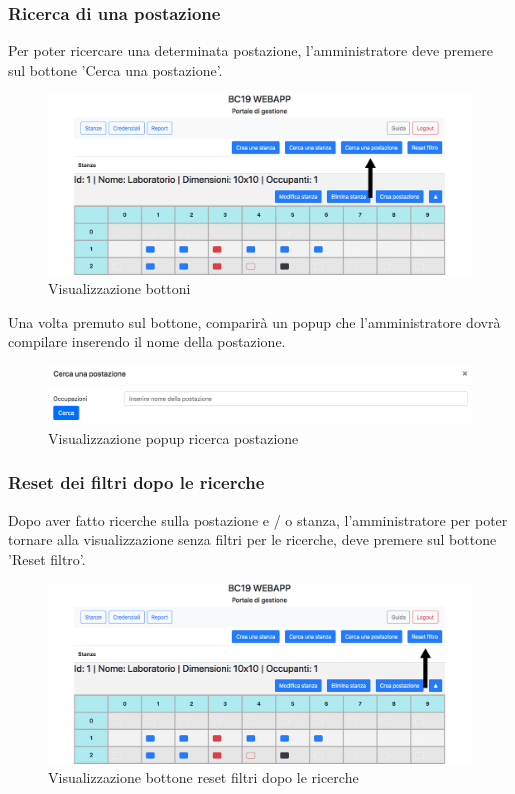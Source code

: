 \subsubsection{Ricerca di una postazione}
Per poter ricercare una determinata postazione, l'amministratore deve premere sul bottone 'Cerca una postazione'.
\begin{figure}[H]
	\centering
	\includegraphics[width=15cm]{res/images/bottoneSearchWorkstation.png}
	\caption{Visualizzazione bottoni}
\end{figure}
Una volta premuto sul bottone, comparirà un popup che l'amministratore dovrà compilare inserendo il nome della postazione.
\begin{figure}[H]
	\centering
	\includegraphics[width=15cm]{res/images/searchWorkstation.png}
	\caption{Visualizzazione popup ricerca postazione}
\end{figure}

\subsubsection{Reset dei filtri dopo le ricerche}
Dopo aver fatto ricerche sulla postazione e / o stanza, l'amministratore per poter tornare alla visualizzazione senza filtri per le ricerche, deve premere sul bottone 'Reset filtro'.
\begin{figure}[H]
	\centering
	\includegraphics[width=15cm]{res/images/resetFiltri.png}
	\caption{Visualizzazione bottone reset filtri dopo le ricerche}
\end{figure}

